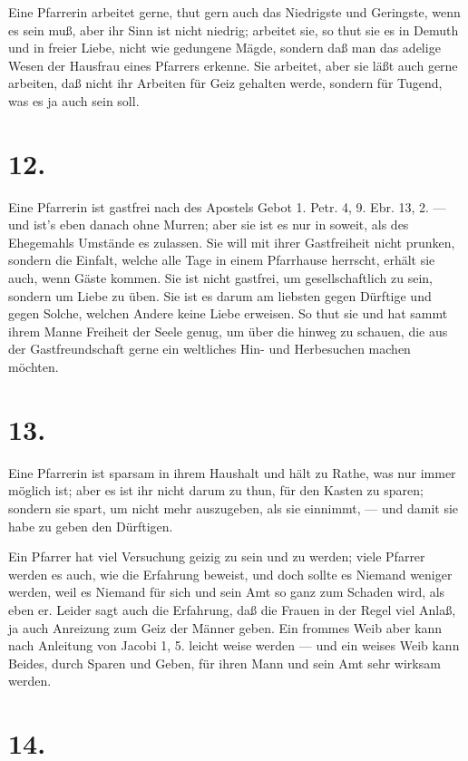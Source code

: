 Eine Pfarrerin arbeitet gerne, thut gern auch das Niedrigste und Geringste, wenn es sein muß, aber ihr Sinn ist nicht niedrig; arbeitet sie, so thut sie es in Demuth und in freier Liebe, nicht wie gedungene Mägde, sondern daß man das adelige Wesen der Hausfrau eines Pfarrers erkenne. Sie arbeitet, aber sie läßt auch gerne arbeiten, daß nicht ihr Arbeiten für Geiz gehalten werde, sondern für Tugend, was es ja auch sein soll.

\section{12.}

Eine Pfarrerin ist gastfrei nach des Apostels Gebot 1. Petr. 4, 9. Ebr. 13, 2. — und ist’s eben danach ohne Murren; aber sie ist es nur in soweit, als des Ehegemahls Umstände es zulassen. Sie will mit ihrer Gastfreiheit nicht prunken, sondern die Einfalt, welche alle Tage in einem Pfarrhause herrscht, erhält sie auch, wenn Gäste kommen. Sie ist nicht gastfrei, um gesellschaftlich zu sein, sondern um Liebe zu üben. Sie ist es darum am liebsten gegen Dürftige und gegen
Solche, welchen Andere keine Liebe erweisen. So thut sie und hat sammt ihrem Manne Freiheit der Seele genug, um über die hinweg zu schauen, die aus der Gastfreundschaft gerne ein weltliches Hin- und Herbesuchen machen möchten.

\section{13.}

Eine Pfarrerin ist sparsam in ihrem Haushalt und hält zu Rathe, was nur immer möglich ist; aber es ist ihr nicht darum zu thun, für den Kasten zu sparen; sondern sie spart, um nicht mehr auszugeben, als sie einnimmt, — und damit sie habe zu geben den Dürftigen.

Ein Pfarrer hat viel Versuchung geizig zu sein und zu werden; viele Pfarrer werden es auch, wie die Erfahrung beweist, und doch sollte es Niemand weniger werden, weil es Niemand für sich und sein Amt so ganz zum Schaden wird, als eben er. Leider sagt auch die Erfahrung, daß die Frauen in der Regel viel Anlaß, ja auch Anreizung zum Geiz der Männer geben. Ein frommes Weib aber kann nach Anleitung von Jacobi 1, 5. leicht weise werden — und ein weises Weib kann Beides, durch Sparen und Geben, für ihren Mann und sein Amt sehr wirksam werden.

\section{14.}

